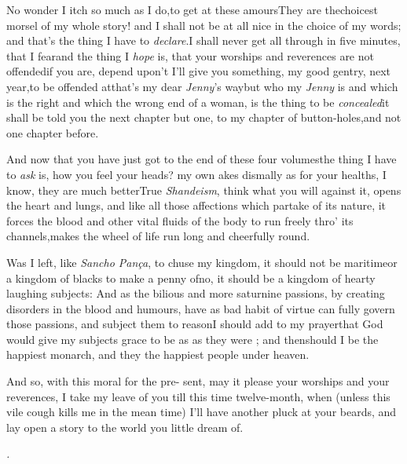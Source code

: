 \documentclass{article}
\begin{document}
No wonder I itch so much as I do,\break to get at these
amours\tsh They are the\break choicest morsel of my whole story! and
\break
I shall not be at all nice in the choice of my words;\tsh
and that’s the thing I have to \textit{declare}.\tsk I shall
never get all through in five minutes, that I fear\tsh and
the thing I \textit{hope} is, that your worships and
reverences are not offended\tsk if you are, depend upon’t
I’ll give you something, my good gentry, next year,\pb to be
offended at\tsh that’s my dear \textit{Jenny}’s way\tsk but
who my \textit{Jenny} is\tsk\break
and which is the right and which the wrong end of a woman, is the thing to be
\textit{concealed}\tsk it shall be told you the next
chapter but one, to my chapter of button-holes,\tsk and not
one chapter before.


And now that you have just got to\break
the end of these four volumes\tsh the\break
thing I have to \textit{ask} is, how you feel\break
your heads? my own akes dismally\tsh\break
as for your healths, I know, they are\break
much better\tsh True \textit{Shandeism}, think\break
what you will against it, opens the\break
heart and lungs, and like all those affections which
partake of its nature, it forces the blood and other vital
fluids of the body to run freely thro’ its channels,\pb makes
the wheel of life run long and cheerfully round.

Was I left, like \textit{Sancho Pança}, to\break
chuse my kingdom, it should not be\break
maritime\tsk or a kingdom of blacks to make a penny of\tsh no, it should\break
be a kingdom of hearty laughing subjects: And as the bilious and more
sa\-turnine passions, by creating disorders\break
in the blood and humours, have as bad\break
{}
habit of virtue can fully govern those passions, and subject them to
reason\tsh I should add to my prayer\tsk that God would give
my subjects grace to be as  as they were
; and then\break should I be the happiest monarch,
and they the happiest people under heaven.\tsk

\newpage
And so, with this moral for the pre-\break
sent, may it please your worships and\break
your reverences, I take my leave of you\break
till this time twelve-month, when (unless\break
this vile cough kills me in the mean\break
time) I’ll have another pluck at your\break
beards, and lay open a story to the\break
world you little dream of.

\vskip 72pt
\centerline{\itshape{}.}
\end{document}
